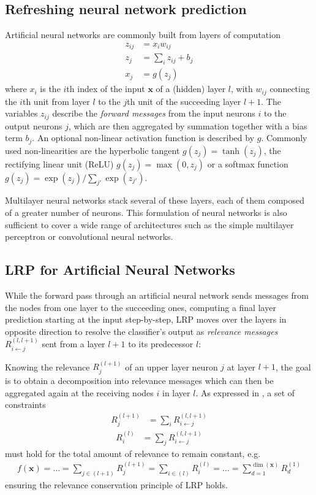 \documentclass[a4wide]{article}
\newcommand{\x}{\boldsymbol{x}}
\begin{document}
\subsection*{Refreshing neural network prediction}
Artificial neural networks are commonly built from layers of computation
\begin{align}
z_{ij} &  =  x_iw_{ij} \\
z_j & =  \sum\limits_i z_{ij} + b_j\\
x_j & =  g(z_j)
\end{align}
where $x_i$ is the $i$th index of the input $\x$ of a (hidden) layer $l$, with $w_{ij}$ connecting the $i$th unit from layer $l$ to the $j$th unit of the succeeding layer $l+1$. 
The variables $z_{ij}$ describe the \emph{forward messages} from the input neurons $i$ to the output neurons $j$, which are then aggregated by summation together with a bias term $b_j$.
An optional non-linear activation function is described by $g$. 
Commonly used non-linearities are the hyperbolic tangent $g(z_j) = \tanh(z_j)$, the rectifying linear unit (ReLU) $g(z_j) = \max(0,z_j)$ or a softmax function $g(z_j) = \exp(z_j)/\sum_{j'}\exp(z_{j'})$.

 Multilayer neural networks stack several of these layers, each of them composed of a greater number of neurons. This formulation of neural networks is also sufficient to cover a wide range of architectures such as the simple multilayer perceptron or convolutional neural networks.

\subsection*{LRP for Artificial Neural Networks}
While the forward pass through an artificial neural network sends messages from the nodes from one layer to the succeeding ones, computing a final layer prediction starting at the input step-by-step, LRP moves over the layers in opposite direction to resolve the classifier's output as \emph{relevance messages} $R^{(l,l+1)}_{i\leftarrow j}$ sent from a layer $l+1$ to its predecessor $l$:

Knowing the relevance $R_j^{(l+1)}$ of an upper layer neuron $j$ at layer $l+1$, the goal is to obtain a decomposition into relevance messages which can then be aggregated again at the receiving nodes $i$ in layer $l$. As expressed in \cite{bach15}, a set of constraints
\begin{align}
R_j^{(l+1)} & =  \sum\limits_{i} R_{i \leftarrow j}^{(l,l+1)}
\label{eq:c1}
\end{align}
\begin{align}
R_i^{(l)} & = \sum\limits_{j} R_{i \leftarrow j}^{(l,l+1)}
\label{eq:c2}
\end{align}
must hold for the total amount of relevance to remain constant, e.g.
\begin{align}
f(\x) = \dots = \sum\limits_{j \in (l+1)} R^{(l+1)}_j = \sum\limits_{i \in (l)} R^{(l)}_i = \dots = \sum\limits_{d=1}^{\dim(\x)} R^{(1)}_d
\label{eq:cons}
\end{align}
ensuring the relevance conservation principle of LRP holds.
\end{document}
